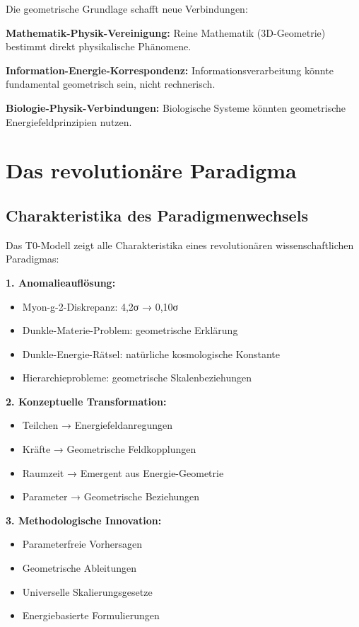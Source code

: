 \documentclass[12pt,a4paper]{report}
\begin{document}
	Die geometrische Grundlage schafft neue Verbindungen:
	
	\textbf{Mathematik-Physik-Vereinigung:}
	Reine Mathematik (3D-Geometrie) bestimmt direkt physikalische Phänomene.
	
	\textbf{Information-Energie-Korrespondenz:}
	Informationsverarbeitung könnte fundamental geometrisch sein, nicht rechnerisch.
	
	\textbf{Biologie-Physik-Verbindungen:}
	Biologische Systeme könnten geometrische Energiefeldprinzipien nutzen.
	
	\section{Das revolutionäre Paradigma}
	\label{sec:revolutionary_paradigm}
	
	\subsection{Charakteristika des Paradigmenwechsels}
	\label{subsec:paradigm_shift_characteristics}
	
	Das T0-Modell zeigt alle Charakteristika eines revolutionären wissenschaftlichen Paradigmas:
	
	\textbf{1. Anomalieauflösung:}
	\begin{itemize}
		\item Myon-g-2-Diskrepanz: 4,2σ → 0,10σ
		\item Dunkle-Materie-Problem: geometrische Erklärung
		\item Dunkle-Energie-Rätsel: natürliche kosmologische Konstante
		\item Hierarchieprobleme: geometrische Skalenbeziehungen
	\end{itemize}
	
	\textbf{2. Konzeptuelle Transformation:}
	\begin{itemize}
		\item Teilchen → Energiefeldanregungen
		\item Kräfte → Geometrische Feldkopplungen
		\item Raumzeit → Emergent aus Energie-Geometrie
		\item Parameter → Geometrische Beziehungen
	\end{itemize}
	
	\textbf{3. Methodologische Innovation:}
	\begin{itemize}
		\item Parameterfreie Vorhersagen
		\item Geometrische Ableitungen
		\item Universelle Skalierungsgesetze
		\item Energiebasierte Formulierungen
	\end{itemize}
	
\end{document}
